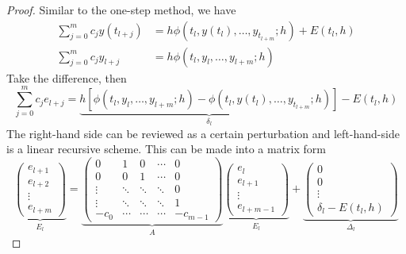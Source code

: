 \begin{proof}
    Similar to the one-step method, we have 
    \begin{equation}
        \begin{aligned}
            \sum_{j=0}^m c_j y(t_{l+j}) &= h \phi(t_l, y(t_l),\dots, y_{t_{l+m}}; h) + E(t_l, h) \\
            \sum_{j=0}^m c_j y_{l+j} &= h \phi(t_l, y_l,\dots, y_{l+m}; h) 
        \end{aligned}
    \end{equation}
    Take the difference, then 
    \begin{equation}
        \sum_{j=0}^m c_j e_{l+j} = \underbrace{h\left[  \phi(t_l, y_l,\dots, y_{l+m}; h)  - \phi(t_l, y(t_l),\dots, y_{t_{l+m}}; h)  \right]}_{\delta_l} - E(t_l, h)
    \end{equation}
    The right-hand side can be reviewed as a certain perturbation and left-hand-side is a linear recursive scheme. This can be made into a matrix form 
    \begin{equation}
        \underbrace{\begin{pmatrix}
            e_{l+1} \\ e_{l+2}\\ \vdots \\ e_{l +m} 
        \end{pmatrix}}_{E_l} = 
        \underbrace{\begin{pmatrix}
            0& 1 & 0 & \cdots  & 0\\
            0& 0 & 1 & \cdots &  0 \\
            \vdots & \ddots & \ddots & \ddots  & 0\\
            \vdots & \ddots & \ddots & \ddots  & 1\\
            -c_0 & \cdots & \cdots & \cdots  &- c_{m-1} 
        \end{pmatrix}}_{A}
        \underbrace{\begin{pmatrix}
            e_{l} \\ e_{l+1}\\ \vdots \\ e_{l +m-1} 
        \end{pmatrix}}_{E_l} + 
        \underbrace{\begin{pmatrix}
            0 \\0\\ \vdots \\ \delta_l - E(t_l, h)
        \end{pmatrix}}_{\Delta_l}  
    \end{equation}

\end{proof}

